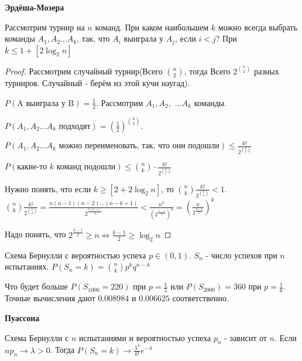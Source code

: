 \begin{theorem}
    \textbf{Эрдёша-Мозера}

    Рассмотрим турнир на $n$ команд. При каком наибольшем $k$ можно
    всегда выбрать команды $A_1, A_2 \ldots A_k$, так, что $A_i$
    выиграла у $A_j$, если $i < j$? При $k \leqslant 1 +  [2 \log_2 n] $
\end{theorem}

\begin{proof}
    Рассмотрим случайный турнир(Всего $\binom{n}{2}$, тогда Всего
    $2^{\binom{n}{2}}$ разных турниров. Случайный - берём из этой
    кучи наугад).
    
    $P(\text{A выиграла у B}) = \frac{1}{2}$. Рассмотрим $A_1, A_2,$
    $\ldots A_k$ команды.
    
    $P(A_1, A_2 \ldots A_k  \text{ подходят}) = (\frac{1}{2})^{\binom{k}{2}}$.

    $P(A_1, A_2 \ldots A_k \text{ можно переименовать, так, что они подошли}) \leqslant \frac{k!}{2^{\binom{k}{2}}}$

    $P(\text{какие-то $k$ команд подошли}) \leqslant \binom{n}{k} \cdot \frac{k!}{2^{\binom{k}{2}}}$
    
    Нужно понять, что если $k \geqslant [2 + 2\log_2 n]$, то $\binom{n}{k} \frac{k!}{2^{\binom{k}{2}}} < 1$.
    $\binom{n}{k} \frac{k!}{2^{\binom{k}{2}}} = \frac{n(n - 1)(n - 2) \ldots (n - k + 1)}{2^{\frac{k(k - 1)}{2}}} < \frac{n^k}{(2^{\frac{k - 1}{2}})^k} = (\frac{n}{2^{\frac{k - 1}{2}}})^k$

    Надо понять, что $2^{\frac{k - 1}{2}} \geqslant n \Leftrightarrow \frac{k - 1}{2} \geqslant \log_2 n$
\end{proof}


\begin{definition}
    Схема Бернулли с вероятностью успеха $p \in (0, 1)$. $S_n$ - число успехов при $n$ испытаниях. $P(S_n = k) = \binom{n}{k} p^k q^{n - k}$

    Что будет больше $P(S_{1000} = 220)$ при $p = \frac{1}{5}$ или $P(S_{2000}) = 360$ при $p = \frac{1}{6}$. Точные вычисления дают $0.008984$ и 
    $0.006625$ соответственно.

\end{definition}

\begin{theorem}
    \textbf{Пуассона}

    Схема Бернулли с $n$ испытаниями и вероятностью успеха $p_n$ - зависит от $n$.
    Если $np_n \rightarrow \lambda > 0$. Тогда $P(S_n = k) \rightarrow \frac{\lambda^k}{k!} e^{-\lambda}$
\end{theorem}

